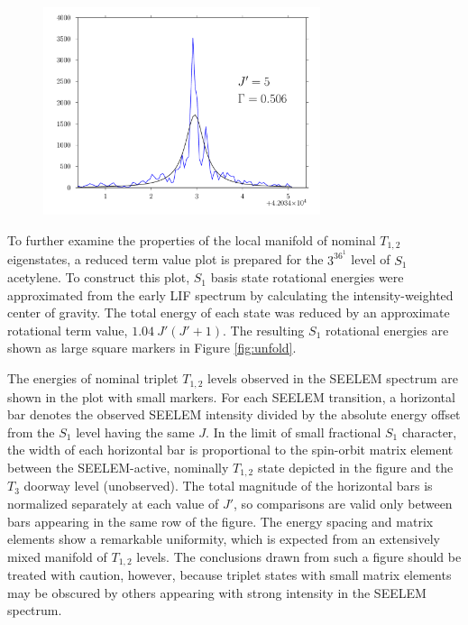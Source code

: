 \documentclass[12pt]{mitthesis}
\begin{document}
\begin{figure}
  \includegraphics[width=3.2in]{3361-q5-seelemfit}
\end{figure}


To further examine the properties of the local manifold of nominal
$T_{1,2}$ eigenstates, a reduced term value plot is prepared for the
$3^36^1$  level of $S_1$ acetylene.  To construct this plot,
$S_1$ basis state rotational energies were approximated
from the early LIF spectrum by calculating the intensity-weighted
center of gravity.  The total energy of each state was reduced by an
approximate rotational term value, $1.04 \: J'(J'+1)$.  The resulting
$S_1$ rotational energies are shown as large square markers in Figure
\ref{fig:unfold}.

The energies of nominal triplet $T_{1,2}$ levels observed in the
SEELEM spectrum are shown in the plot with small markers.  For each
SEELEM transition, a horizontal bar denotes the observed SEELEM
intensity divided by the absolute energy offset from the $S_1$ level
having the same $J$.  In the limit of small fractional $S_1$
character, the width of each horizontal bar is proportional to the
spin-orbit matrix element between the SEELEM-active, nominally
$T_{1,2}$ state depicted in the figure and the $T_3$ doorway level
(unobserved).  The total magnitude of the horizontal bars is
normalized separately at each value of $J'$, so comparisons are valid
only between bars appearing in the same row of the figure.  The energy
spacing and matrix elements show a remarkable uniformity, which is
expected from an extensively mixed manifold of $T_{1,2}$ levels.  The
conclusions drawn from such a figure should be treated with caution,
however, because triplet states with small matrix elements may be
obscured by others appearing with strong intensity in the SEELEM
spectrum.
\end{document}
